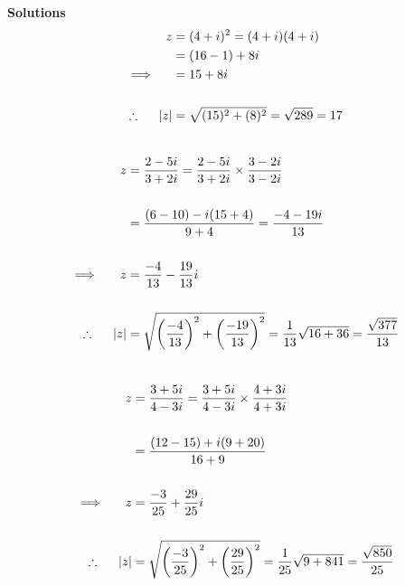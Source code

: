 \documentclass[11pt,a4paper]{article}
\begin{document}
\textbf{Solutions}
\begin{align*}
z & = (4+i)^2=(4+i)(4+i)\\
  & = (16-1)+8i\\
\implies \hspace{0.5cm} & = 15+8i\\\\
\therefore \hspace{0.5cm} |z| & = \sqrt{(15)^2+(8)^2}=\sqrt{289}=17\\\\
\end{align*}


\begin{align*}
z & = \frac{2-5i}{3+2i}=\frac{2-5i}{3+2i}\times \frac{3-2i}{3-2i}\\\\
  & = \frac{(6-10)-i(15+4)}{9+4}=\frac{-4-19i}{13}\\\\
\implies \hspace{0.5cm} z & = \frac{-4}{13}-\frac{19}{13}i\\\\
\therefore \hspace{0.5cm} |z| & = \sqrt{\bigg(\dfrac{-4}{13}\bigg)^2+\bigg(\dfrac{-19}{13}\bigg)^2}=\frac{1}{13}\sqrt{16+36}=\frac{\sqrt{377}}{13}\\\\
\end{align*}




\begin{align*}
z & = \frac{3+5i}{4-3i}=\frac{3+5i}{4-3i}\times \frac{4+3i}{4+3i}\\\\
  & = \frac{(12-15)+i(9+20)}{16+9}\\\\
\implies \hspace{0.5cm} z & = \frac{-3}{25}+\frac{29}{25}i\\\\
\therefore \hspace{0.5cm} |z| & = \sqrt{\bigg(\dfrac{-3}{25}\bigg)^2+\bigg(\dfrac{29}{25}\bigg)^2}=\frac{1}{25}\sqrt{9+841}=\frac{\sqrt{850}}{25}\\\\
\end{align*}
\end{document}
